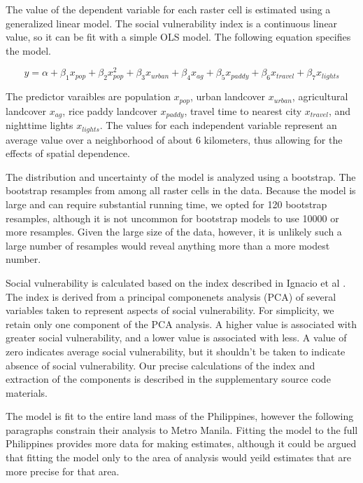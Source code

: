 \documentclass[draft]{article}
\begin{document}
The value of the dependent variable for each raster cell is estimated using a generalized linear model.  The social vulnerability index is a continuous linear value, so it can be fit with a simple OLS model.  The following equation specifies the model.

\[y=\alpha+\beta_1x_{pop}+\beta_2x_{pop}^2+\beta_3x_{urban}+\beta_4x_{ag}+\beta_5x_{paddy}+\beta_6x_{travel}+\beta_7x_{lights}\]

The predictor varaibles are population $x_{pop}$, urban landcover $x_{urban}$, agricultural landcover $x_{ag}$, rice paddy landcover $x_{paddy}$, travel time to nearest city $x_{travel}$, and nighttime lights $x_{lights}$.  The values for each independent variable represent an average value over a neighborhood of about 6 kilometers, thus allowing for the effects of spatial dependence.

The distribution and uncertainty of the model is analyzed using a bootstrap.  The bootstrap resamples from among all raster cells in the data.  Because the model is large and can require substantial running time, we opted for 120 bootstrap resamples, although it is not uncommon for bootstrap models to use 10000 or more resamples.  Given the large size of the data, however, it is unlikely such a large number of resamples would reveal anything more than a more modest number.

Social vulnerability is calculated based on the index described in Ignacio et al \cite{ignacio15}.  The index is derived from a principal componenets analysis (PCA) of several variables taken to represent aspects of social vulnerability.  For simplicity, we retain only one component of the PCA analysis.  A higher value is associated with greater social vulnerability, and a lower value is associated with less.  A value of zero indicates average social vulnerability, but it shouldn't be taken to indicate absence of social vulnerability.  Our precise calculations of the index and extraction of the components is described in the supplementary source code materials.

The model is fit to the entire land mass of the Philippines, however the following paragraphs constrain their analysis to Metro Manila.  Fitting the model to the full Philippines provides more data for making estimates, although it could be argued that fitting the model only to the area of analysis would yeild estimates that are more precise for that area.
\end{document}
